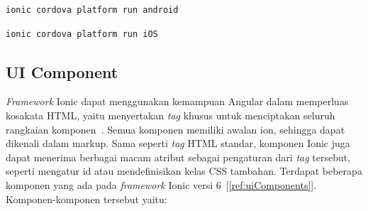 \begin{lstlisting}[label={lst:runCordovaAndroid}, caption=Kode untuk Membuat Aplikasi Cordova Untuk Perangkat Android]
ionic cordova platform run android
\end{lstlisting} 

\begin{lstlisting}[label={lst:runCordovaiOS}, caption=Kode untuk Membuat Aplikasi Cordova Untuk Perangkat iOS]
ionic cordova platform run iOS
\end{lstlisting} 

\subsection{UI Component}
\label{subsec:uiComponent}
{\it Framework} Ionic dapat menggunakan kemampuan Angular dalam memperluas kosakata HTML, yaitu menyertakan {\it tag} khusus untuk menciptakan seluruh rangkaian komponen~\cite{griffith:17:mobile}. Semua komponen memiliki awalan ion, sehingga dapat dikenali dalam markup. Sama seperti {\it tag} HTML standar, komponen Ionic juga dapat menerima berbagai macam atribut sebagai pengaturan dari {\it tag} tersebut, seperti mengatur id atau mendefinisikan kelas CSS tambahan. Terdapat beberapa komponen yang ada pada {\it framework} Ionic versi 6~[\ref{ref:uiComponents}]. Komponen-komponen tersebut yaitu:

